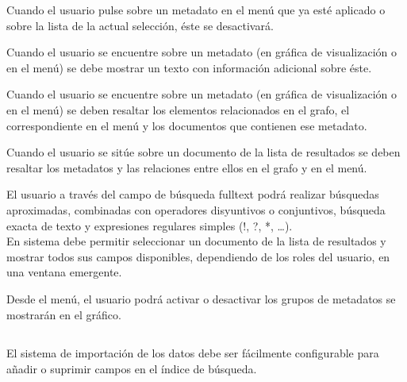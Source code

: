 Cuando el usuario pulse sobre un \gls{metadato} en el menú que ya esté aplicado o sobre la lista de la actual selección, éste se desactivará. 

Cuando el usuario se encuentre sobre un \gls{metadato} (en gráfica de visualización o en el menú) se debe mostrar un texto con información adicional sobre éste.

Cuando el usuario se encuentre sobre un \gls{metadato} (en gráfica de visualización o en el menú) se deben resaltar los elementos relacionados en el grafo, el correspondiente en el menú y los documentos que contienen ese \gls{metadato}.

Cuando el usuario se sitúe sobre un documento de la lista de resultados se deben resaltar los \glspl{metadato} y las relaciones entre ellos en el grafo y en el menú.

El usuario a través del campo de búsqueda \gls{fulltext} podrá realizar búsquedas aproximadas, combinadas con operadores disyuntivos o conjuntivos, búsqueda exacta de texto y expresiones regulares simples (!, ?, *, \dots).\\

En sistema debe permitir seleccionar un documento de la lista de resultados y mostrar todos sus campos disponibles, dependiendo de los roles del usuario, en una ventana emergente.  

Desde el menú, el usuario podrá activar o desactivar los grupos de \glspl{metadato} se mostrarán en el gráfico.

\subsection{}

El sistema de importación de los datos debe ser fácilmente configurable para añadir o suprimir campos en el índice de búsqueda. 

